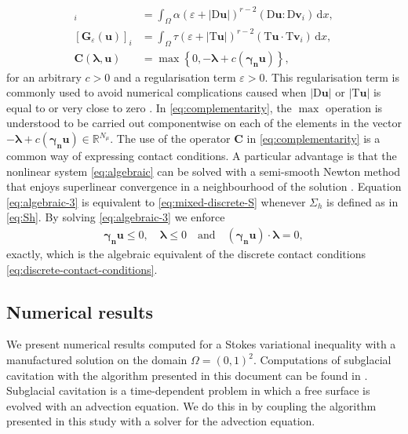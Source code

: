 \documentclass[onefignum,onetabnum]{siamart190516}
\newcommand{\RR}{\mathbb{R}}
\newcommand{\bu}{\boldsymbol{u}}
\newcommand{\bv}{\boldsymbol{v}}
\newcommand{\blambda}{\boldsymbol{\lambda}}
\newcommand{\bT}{\boldsymbol{\mathrm{T}}}
\newcommand{\bD}{\boldsymbol{\mathrm{D}}}
\newcommand{\dd}{\mathrm{d}}
\begin{document}
%
\begin{align}
	[\mathbf{A}_\varepsilon(\mathbf{u})]_i &= \int_\Omega \alpha \left(\varepsilon + |\bD\bu|\right)^{r-2} (\bD \bu : \bD \bv_i)\,\dd x, \label{eq:A-discrete}\\
	[\mathbf{G}_\varepsilon(\mathbf{u})]_i &= \int_\Omega \tau \left(\varepsilon + |\bT\bu|\right)^{r-2} (\bT \bu \cdot \bT \bv_i)\,\dd x, \label{eq:G-discrete}\\
	\mathbf{C}(\blambda,\mathbf{u}) &=  \max{\left\lbrace 0, -\blambda + c (\boldsymbol{\gamma_n}\mathbf{u}) \right\rbrace}, \label{eq:complementarity}
\end{align}
%
for an arbitrary $c>0$ and a regularisation term $\varepsilon > 0$. This regularisation term is commonly used to avoid numerical complications caused when $|\bD\bu|$ or $|\bT\bu|$ is equal to or very close to zero \cite{jouvet2012}. In \eqref{eq:complementarity}, the $\max$ operation is understood to be carried out componentwise on each of the elements in the vector $-\blambda + c (\boldsymbol{\gamma_n}\mathbf{u})\in\RR^{N_\mu}$. The use of the operator $\mathbf{C}$ in \eqref{eq:complementarity} is a common way of expressing contact conditions. A particular advantage is that the nonlinear system \eqref{eq:algebraic} can be solved with a semi-smooth Newton method that enjoys superlinear convergence in a neighbourhood of the solution \cite{hintermuller2002}. Equation \eqref{eq:algebraic-3} is equivalent to \eqref{eq:mixed-discrete-S} whenever $\Sigma_h$ is defined as in \eqref{eq:Sh}. By solving \eqref{eq:algebraic-3} we enforce
%
\begin{align}\label{eq:algebraic-contact}
	\boldsymbol{\gamma_n} \mathbf{u} \leq 0, \quad \boldsymbol{\lambda} \leq 0 \quad \text{and} \quad (\boldsymbol{\gamma_n} \mathbf{u})\cdot \boldsymbol{\lambda} = 0,
\end{align}	
%
exactly, which is the algebraic equivalent of the discrete contact conditions \eqref{eq:discrete-contact-conditions}.


\subsection{Numerical results}

We present numerical results computed for a Stokes variational inequality with a manufactured solution on the domain $\Omega = (0,1)^2$. Computations of subglacial cavitation with the algorithm presented in this document can be found in \cite{dediego2022}. Subglacial cavitation is a time-dependent problem in which a free surface is evolved with an advection equation. We do this in \cite{dediego2022} by coupling the algorithm presented in this study with a solver for the advection equation.
\end{document}
